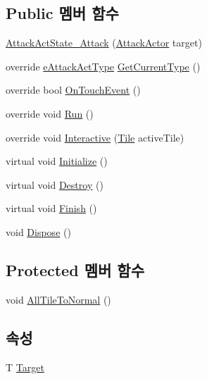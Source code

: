 \subsection*{Public 멤버 함수}
\begin{DoxyCompactItemize}
\item 
\hyperlink{class_attack_actor_1_1_attack_act_state___attack_a2503cf96e99f943f0be13c3a87e7dd12}{Attack\+Act\+State\+\_\+\+Attack} (\hyperlink{class_attack_actor}{Attack\+Actor} target)
\item 
override \hyperlink{_attack_actor_8cs_a10659ce944335df4ded984f6bc41f31b}{e\+Attack\+Act\+Type} \hyperlink{class_attack_actor_1_1_attack_act_state___attack_a6622c1356f5d7384b9914bb9611ad285}{Get\+Current\+Type} ()
\item 
override bool \hyperlink{class_attack_actor_1_1_attack_act_state___attack_aedb0e05d966cc6b98f92a72f9e5e673a}{On\+Touch\+Event} ()
\item 
override void \hyperlink{class_attack_actor_1_1_attack_act_state___attack_a2755f4dae2cf1f80a94b6bcc973d1bfd}{Run} ()
\item 
override void \hyperlink{class_attack_actor_1_1_attack_act_state___attack_a59a3f2e994baeddabb870446b5df1641}{Interactive} (\hyperlink{class_tile}{Tile} active\+Tile)
\item 
virtual void \hyperlink{class_m_c_n_1_1_state_a8eabaffe047e6dccd5c5d8aed7bf218a}{Initialize} ()
\item 
virtual void \hyperlink{class_m_c_n_1_1_state_a32af22a6a0a979d3b3a80225426aa839}{Destroy} ()
\item 
virtual void \hyperlink{class_m_c_n_1_1_state_a6de4f94b23916fcd05f589759da9ac3f}{Finish} ()
\item 
void \hyperlink{class_m_c_n_1_1_state_a6c53b2eda47e718ff469fd76a95cf02a}{Dispose} ()
\end{DoxyCompactItemize}
\subsection*{Protected 멤버 함수}
\begin{DoxyCompactItemize}
\item 
void \hyperlink{class_attack_actor_1_1_attack_act_state_a993762ec959af926e416f03fa7b71203}{All\+Tile\+To\+Normal} ()
\end{DoxyCompactItemize}
\subsection*{속성}
\begin{DoxyCompactItemize}
\item 
T \hyperlink{class_m_c_n_1_1_state_a93ba2fd920292031bd6e65b1dc505cb3}{Target}
\end{DoxyCompactItemize}


